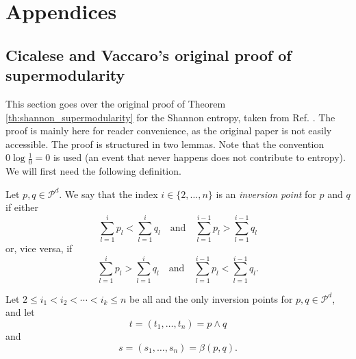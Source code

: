 \appendix
\chapter*{Appendices}
\renewcommand{\thesection}{\Alph{section}}
\renewcommand{\theequation}{\thesection.\arabic{equation}}
\renewcommand{\thefigure}{H.\arabic{figure}} \quad \setcounter{figure}{0} %



\section{Cicalese and Vaccaro's original proof of supermodularity} \label{app:supermodularity}

This section goes over the original proof of Theorem \ref{th:shannon_supermodularity} for the Shannon entropy, taken from Ref. \cite{cicalese_supermodularity_2002}. The proof is mainly here for reader convenience, as the original paper is not easily accessible. The proof is structured in two lemmas. Note that the convention $0 \log \frac{1}{0} = 0$ is used (an event that never happens does not contribute to entropy). We will first need the following definition.

\begin{appendix_definition}
    Let $p, q \in \mathcal{P}^d$. We say that the index $i \in \{2, \ldots, n\}$ is an \textit{inversion point} for $p$ and $q$ if either
\begin{equation}
    \sum_{l=1}^{i} p_l < \sum_{l=1}^{i} q_l \quad \text{and} \quad \sum_{l=1}^{i-1} p_l > \sum_{l=1}^{i-1} q_l    
\end{equation}
or, vice versa, if
\begin{equation}
    \sum_{l=1}^{i} p_l > \sum_{l=1}^{i} q_l \quad \text{and} \quad \sum_{l=1}^{i-1} p_l < \sum_{l=1}^{i-1} q_l.
\end{equation}
\end{appendix_definition}

\noindent Let $2 \leq i_1 < i_2 < \cdots < i_k \leq n$ be all and the only inversion points for $p, q \in \mathcal{P}^d$, and let
\begin{equation}
    t = (t_1, \ldots, t_n) = p \wedge q
\end{equation}
and
\begin{equation}
    s = (s_1, \ldots, s_n) = \beta(p, q).
\end{equation}

